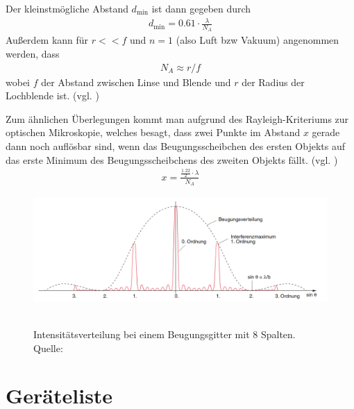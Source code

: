 \documentclass{article}
\begin{document}
Der kleinstmögliche Abstand $d_{\operatorname{min}}$ ist dann gegeben durch
\begin{align}
\label{eq:theor_aufl}
d_{\text{min}} = 0.61 \cdot \frac{\lambda}{N_A}
\end{align}
Außerdem kann für $r<<f$ und $n=1$ (also Luft bzw Vakuum) angenommen werden, dass
\begin{align}
\label{eq:na}
N_A \approx r/f
\end{align}
wobei $f$ der Abstand zwischen Linse und Blende und $r$ der Radius der Lochblende ist.  (vgl. \cite{quelle1} \cite{quelle2} \cite{quelle3})

Zum ähnlichen Überlegungen kommt man aufgrund des Rayleigh-Kriteriums zur optischen Mikroskopie, welches besagt, dass zwei Punkte im Abstand $x$ gerade dann noch auflösbar sind, wenn das Beugungsscheibchen des ersten Objekts auf das erste Minimum des Beugungsscheibchens des zweiten Objekts fällt. (vgl. \cite{quelle4} \cite{quelle5})
\begin{align}
x = \frac{\frac{1.22}{2}\cdot \lambda}{N_A}
\end{align}



\begin{figure}[H]
\caption{Intensitätsverteilung bei einem Beugungsgitter mit 8 Spalten. Quelle: \cite{demtroeder}}
\label{fig:beugung}
{\centering
\includegraphics[scale=0.9]{demtr_10_44.png}
~
}
\end{figure}





\section{Geräteliste}
\end{document}
